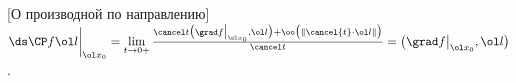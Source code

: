 [О производной по направлению]
	 $\ds\CP f{\ol l}\bigg|_{\ol x_0} = \lim\limits_{t\to 0+}\frac{\cancel t\big(\grad f\bigm|_{\ol x_0},\ol l\big) + \oo\big(\|\cancel{t}\cdot \ol l\|\big)}{\cancel t} = \big(\grad f\big|_{\ol x_0},\ol l\big)$.
	 